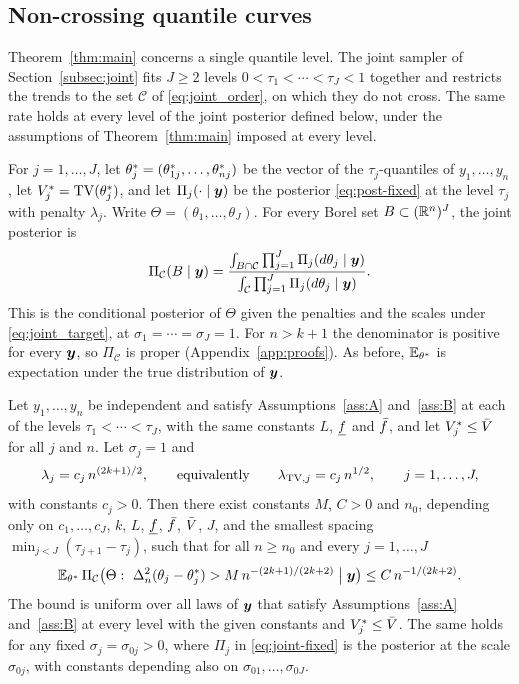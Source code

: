 \subsection{Non-crossing quantile curves}\label{sec:joint-result}

Theorem~\ref{thm:main} concerns a single quantile level. The joint sampler of Section~\ref{subsec:joint} fits $J\ge2$ levels $0<\tau_1<\cdots<\tau_J<1$ together and restricts the trends to the set $\mathcal C$ of \eqref{eq:joint_order}, on which they do not cross. The same rate holds at every level of the joint posterior defined below, under the assumptions of Theorem~\ref{thm:main} imposed at every level.

For $j=1,\dots,J$, let $\theta^{*}_j=(\theta^{*}_{1j},\dots,\theta^{*}_{nj})$ be the vector of the $\tau_j$-quantiles of $y_1,\dots,y_n$, let $V^{*}_j=\mathrm{TV}(\theta^{*}_j)$, and let $\Pi_j(\cdot\mid\bm{y})$ be the posterior \eqref{eq:post-fixed} at the level $\tau_j$ with penalty $\lambda_j$. Write $\Theta=(\theta_1,\dots,\theta_J)$. For every Borel set $B\subset(\mathbb{R}^n)^J$, the joint posterior is
\begin{equation}\label{eq:joint-fixed}
\Pi_{\mathcal C}(B\mid\bm{y})=\frac{\int_{B\cap\mathcal C}\prod_{j=1}^J\Pi_j(d\theta_j\mid\bm{y})}{\int_{\mathcal C}\prod_{j=1}^J\Pi_j(d\theta_j\mid\bm{y})} .
\end{equation}
This is the conditional posterior of $\Theta$ given the penalties and the scales under \eqref{eq:joint_target}, at $\sigma_1=\cdots=\sigma_J=1$. For $n>k+1$ the denominator is positive for every $\bm{y}$, so $\Pi_{\mathcal C}$ is proper (Appendix~\ref{app:proofs}). As before, $\mathbb{E}_{\theta^{*}}$ is expectation under the true distribution of $\bm{y}$.

\begin{theorem}\label{thm:joint}
Let $y_1,\dots,y_n$ be independent and satisfy Assumptions~\ref{ass:A} and~\ref{ass:B} at each of the levels $\tau_1<\cdots<\tau_J$, with the same constants $L$, $\underline f$ and $\bar f$, and let $V^{*}_j\le\bar V$ for all $j$ and $n$. Let $\sigma_j=1$ and
\[
\lambda_j=c_j\,n^{(2k+1)/2},\qquad\text{equivalently}\qquad\lambda_{\mathrm{TV},j}=c_j\,n^{1/2},\qquad j=1,\dots,J,
\]
with constants $c_j>0$. Then there exist constants $M$, $C>0$ and $n_0$, depending only on $c_1,\dots,c_J$, $k$, $L$, $\underline f$, $\bar f$, $\bar V$, $J$, and the smallest spacing $\min_{j<J}(\tau_{j+1}-\tau_j)$, such that for all $n\ge n_0$ and every $j=1,\dots,J$
\[
\E_{\thetas}\,\Pi_{\mathcal C}\bigl(\Theta:\ \Delta_n^2(\theta_j-\thetas_j)>M\,n^{-(2k+1)/(2k+2)}\bigm|\by\bigr)\le C\,n^{-1/(2k+2)}.
\]
The bound is uniform over all laws of $\bm{y}$ that satisfy Assumptions~\ref{ass:A} and~\ref{ass:B} at every level with the given constants and $V^{*}_j\le\bar V$. The same holds for any fixed $\sigma_j=\sigma_{0j}>0$, where $\Pi_j$ in \eqref{eq:joint-fixed} is the posterior at the scale $\sigma_{0j}$, with constants depending also on $\sigma_{01},\dots,\sigma_{0J}$.
\end{theorem}

